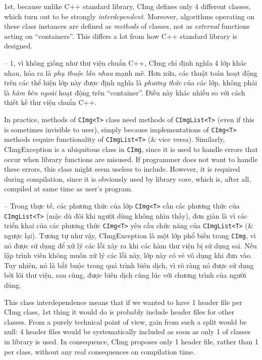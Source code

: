 \documentclass{article}
\begin{document}
\begin{itemize}
\begin{itemize}
\begin{enumerate}
            1st, because unlike C++ standard library, CImg defines only 4 different classes, which turn out to be strongly {\it interdependent}. Moreover, algorithms operating on these class instances are defined as {\it methods} of classes, not as {\it external} functions acting on ``containers''. This differs a lot from how C++ standard library is designed.
            
            -- 1, vì không giống như thư viện chuẩn C++, CImg chỉ định nghĩa 4 lớp khác nhau, hóa ra là {\it phụ thuộc lẫn nhau} mạnh mẽ. Hơn nữa, các thuật toán hoạt động trên các thể hiện lớp này được định nghĩa là {\it phương thức} của các lớp, không phải là {\it hàm bên ngoài} hoạt động trên ``container''. Điều này khác nhiều so với cách thiết kế thư viện chuẩn C++.
            
            In practice, methods of {\tt CImg<T>} class need methods of {\tt CImgList<T>} (even if this is sometimes invisible to user), simply because implementations of {\tt CImg<T>} methods require functionality of {\tt CImgList<T>} (\& vice versa). Similarly, {\sc CImgException} is a ubiquitous class in {\tt CImg}, since it is used to handle errors that occur when library functions are misused. If programmer does not want to handle these errors, this class might seem useless to include. However, it is required during compilation, since it is obviously used by library core, which is, after all, compiled at same time as user's program.
            
            -- Trong thực tế, các phương thức của lớp {\tt CImg<T>} cần các phương thức của {\tt CImgList<T>} (mặc dù đôi khi người dùng không nhìn thấy), đơn giản là vì các triển khai của các phương thức {\tt CImg<T>} yêu cầu chức năng của {\tt CImgList<T>} (\& ngược lại). Tương tự như vậy, {\sc CImgException} là một lớp phổ biến trong {\tt CImg}, vì nó được sử dụng để xử lý các lỗi xảy ra khi các hàm thư viện bị sử dụng sai. Nếu lập trình viên không muốn xử lý các lỗi này, lớp này có vẻ vô dụng khi đưa vào. Tuy nhiên, nó là bắt buộc trong quá trình biên dịch, vì rõ ràng nó được sử dụng bởi lõi thư viện, sau cùng, được biên dịch cùng lúc với chương trình của người dùng.
            
            This class interdependence means that if we wanted to have 1 header file per CImg class, 1st thing it would do is probably include header files for other classes. From a purely technical point of view, gain from such a split would be null: 4 header files would be systematically included as soon as only 1 of classes in library is used. In consequence, CImg proposes only 1 header file, rather than 1 per class, without any real consequences on compilation time.
            

\end{enumerate}
\end{itemize}
\end{itemize}
\end{document}
